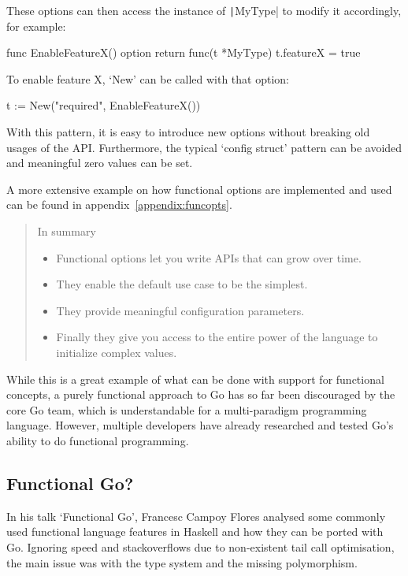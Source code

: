 These options can then access the instance of \texttt|MyType| to modify it accordingly,
for example:

\begin{gocode}
func EnableFeatureX() option {
	return func(t *MyType) {
		t.featureX = true
	}
}
\end{gocode}

To enable feature X, `New' can be called with that option:
\begin{gocode}
t := New("required", EnableFeatureX())
\end{gocode}

With this pattern, it is easy to introduce new options without breaking old usages of the API.
Furthermore, the typical `config struct' pattern can be avoided and meaningful zero values
can be set.

A more extensive example on how functional options are implemented and used can be found in
appendix~\ref{appendix:funcopts}.

\begin{quote}
    In summary
    \begin{itemize}
        \item Functional options let you write APIs that can grow over time.
        \item They enable the default use case to be the simplest.
        \item They provide meaningful configuration parameters.
        \item Finally they give you access to the entire power of the language to initialize complex values.
    \end{itemize}\autocite{functional-options}
\end{quote}

While this is a great example of what can be done with support for functional concepts, a purely functional approach to
Go has so far been discouraged by the core Go team, which is understandable for a multi-paradigm programming language.
However, multiple developers have already researched and tested Go's ability to do functional programming.

\subsection{Functional Go?}

In his talk `Functional Go'\autocite{func-go-talk}, Francesc Campoy Flores analysed some commonly used functional
language features in Haskell and how they can be ported with Go. Ignoring speed and stackoverflows due to non-existent
tail call optimisation\autocite{go-tco}, the main issue was with the type system and the missing polymorphism.

